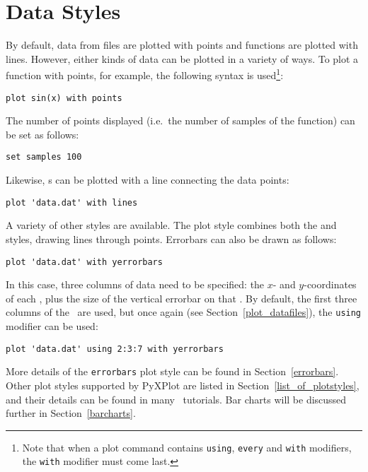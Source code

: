 \section{Data Styles}

By default, data from files are plotted with points and functions are plotted
with lines. However, either kinds of data can be plotted in a variety of ways.
To plot a function with points, for example, the following syntax is
used\footnote{Note that when a plot command contains {\tt using}, {\tt every}
and {\tt with} modifiers, the {\tt with} modifier must come
last.}:

\begin{verbatim}
plot sin(x) with points
\end{verbatim}

\noindent The number of points displayed (i.e.\ the number of samples of the
function) can be set as follows:

\begin{verbatim}
set samples 100
\end{verbatim}

\noindent Likewise, \datafile s can be plotted with a line connecting the data
points:

\begin{verbatim}
plot 'data.dat' with lines
\end{verbatim}

A variety of other styles are available. The  plot style
combines both the  and  styles, drawing lines
through points. Errorbars can also be drawn as follows:

\begin{verbatim}
plot 'data.dat' with yerrorbars
\end{verbatim}

\noindent In this case, three columns of data need to be specified: the $x$-
and $y$-coordinates of each \datapoint, plus the size of the vertical errorbar
on that \datapoint. By default, the first three columns of the \datafile\ are
used, but once again (see Section~\ref{plot_datafiles}), the {\tt using}
modifier can be used:

\begin{verbatim}
plot 'data.dat' using 2:3:7 with yerrorbars
\end{verbatim}

More details of the {\tt errorbars} plot style can be found in
Section~\ref{errorbars}. Other plot styles supported by PyXPlot are listed in
Section~\ref{list_of_plotstyles}, and their details can be found in many
\gnuplot\ tutorials. Bar charts will be discussed further in
Section~\ref{barcharts}.

